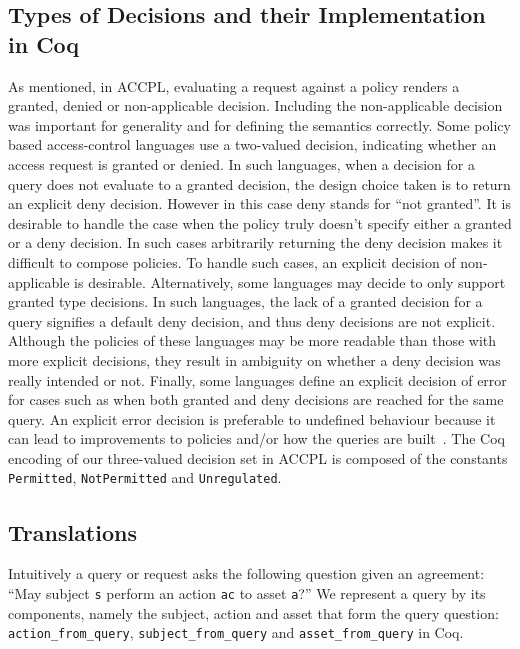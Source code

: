 \documentclass[runningheads,a4paper]{llncs}
\newcommand{\syn}{\texttt}
\begin{document}
\subsection{Types of Decisions and their Implementation in Coq}\label{sec:answerandresulttypes}

As mentioned, in ACCPL, evaluating a request against a policy renders
a granted, denied or non-applicable decision. Including the non-applicable decision was
important for generality and for defining the semantics correctly.
Some policy based access-control languages use a two-valued decision,
indicating whether an access request is granted or denied.  In
such languages, when a decision for a query does not evaluate to a granted decision, the design choice taken is to return an explicit deny
decision. However in this case deny stands for ``not granted''.
It is desirable to handle the case when the policy truly doesn't
specify either a granted or a deny decision. In such cases
arbitrarily returning the deny decision makes it difficult to
compose policies.  To handle such cases, an explicit decision of non-applicable is desirable.  Alternatively, some languages may decide
to only support granted type decisions. In such languages, the lack of a
granted decision for a query signifies a default deny decision,
and thus deny decisions are not explicit. Although the policies of
these languages may be more readable than those with more explicit
decisions, they result in ambiguity on whether a deny decision was
really intended or not. Finally, some languages define an explicit
decision of error for cases such as when both granted and
deny decisions are reached for the same query. An explicit
error decision is preferable to undefined behaviour because it can
lead to improvements to policies and/or how the queries are
built~\cite{Tschantz}. The Coq encoding of our three-valued decision
set in \ac{ACCPL} is composed of the constants \syn{Permitted},
\syn{NotPermitted} and \syn{Unregulated}.

\subsection{Translations}\label{sec:translationfuncs}

Intuitively a query or request asks the following question given an agreement: ``May subject \syn{s} perform an action \syn{ac} to asset \syn{a}?'' We represent a query by its components, namely the subject, action and asset that form the query question: \syn{action_from_query}, \syn{subject_from_query} and \syn{asset_from_query} in Coq. 
\end{document}
